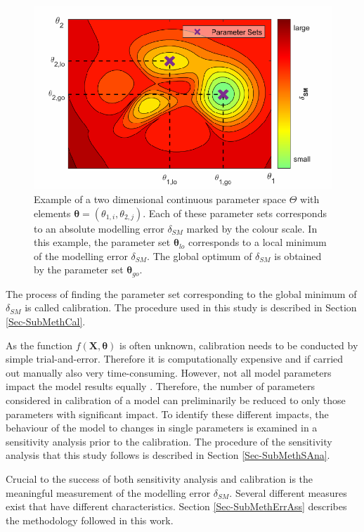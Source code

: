 \begin{figure}[h]
    \centering
    \includegraphics{./img/Fig-ParamSpaceEx.pdf}
    \caption{Example of a two dimensional continuous parameter space $\Theta$ with elements $\bm{\theta} = \left(\theta_{1,i}, \theta_{2,j}\right)$. Each of these parameter sets corresponds to an absolute modelling error $\delta_{SM}$ marked by the colour scale. In this example, the parameter set $\bm{\theta}_{lo}$ corresponds to a local minimum of the modelling error $\delta_{SM}$. The global optimum of $\delta_{SM}$ is obtained by the parameter set $\bm{\theta}_{go}$.}
    \label{Fig-ParamSpaceEx}
\end{figure}

The process of finding the parameter set corresponding to the global minimum of $\delta_{SM}$ is called calibration. 
The procedure used in this study is described in Section \ref{Sec-SubMethCal}. 

As the function $f(\bm{X},\bm{\theta})$ is often unknown, calibration needs to be conducted by simple trial-and-error. 
Therefore it is computationally expensive and if carried out manually also very time-consuming. 
However, not all model parameters impact the model results equally \parencite{Duan.1993}. 
Therefore, the number of parameters considered in calibration of a model can preliminarily be reduced to only those parameters with significant impact. 
To identify these different impacts, the behaviour of the model to changes in single parameters is examined in a sensitivity analysis prior to the calibration. 
The procedure of the sensitivity analysis that this study follows is described in Section \ref{Sec-SubMethSAna}. 

Crucial to the success of both sensitivity analysis and calibration is the meaningful measurement of the modelling error $\delta_{SM}$. 
Several different measures exist that have different characteristics. 
Section \ref{Sec-SubMethErrAss} describes the methodology followed in this work.

